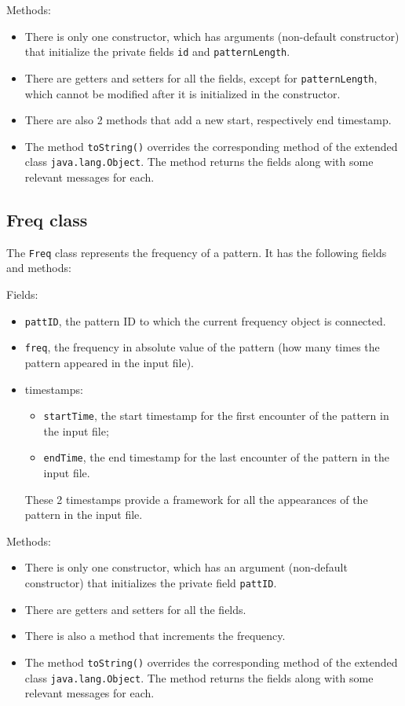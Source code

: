 \documentclass[a4paper,12pt]{article}
\begin{document}
  \noindent
  Methods:
  \begin{itemize}
   \item There is only one constructor, which has arguments (non-default constructor) that
    initialize the private fields \verb/id/ and \verb/patternLength/.
   \item There are getters and setters for all the fields, except for \verb/patternLength/,
    which cannot be modified after it is initialized in the constructor.
   \item There are also 2 methods that add a new start, respectively end timestamp.
   \item The method \verb/toString()/ overrides the corresponding method of the extended class
    \verb/java.lang.Object/. The method returns the fields along with some relevant messages
    for each.
  \end{itemize}

  \subsection{Freq class}
  
  The \verb/Freq/ class represents the frequency of a pattern.
  It has the following fields and methods:
  
  \noindent
  Fields:
  \begin{itemize}
   \item \verb/pattID/, the pattern ID to which the current frequency object is connected.
   \item \verb/freq/, the frequency in absolute value of the pattern (how many times the pattern
    appeared in the input file).
   \item timestamps:
    \begin{itemize}
     \item \verb/startTime/, the start timestamp for the first encounter of the pattern
      in the input file;
     \item \verb/endTime/, the end timestamp for the last encounter of the pattern
      in the input file.
    \end{itemize}
    These 2 timestamps provide a framework for all the appearances of the pattern in the input file.
  \end{itemize}
  
  \noindent
  Methods:
  \begin{itemize}
   \item There is only one constructor, which has an argument (non-default constructor) that
    initializes the private field \verb/pattID/.
   \item There are getters and setters for all the fields.
   \item There is also a method that increments the frequency.
   \item The method \verb/toString()/ overrides the corresponding method of the extended class
    \verb/java.lang.Object/. The method returns the fields along with some relevant messages
    for each.
  \end{itemize}
\end{document}
